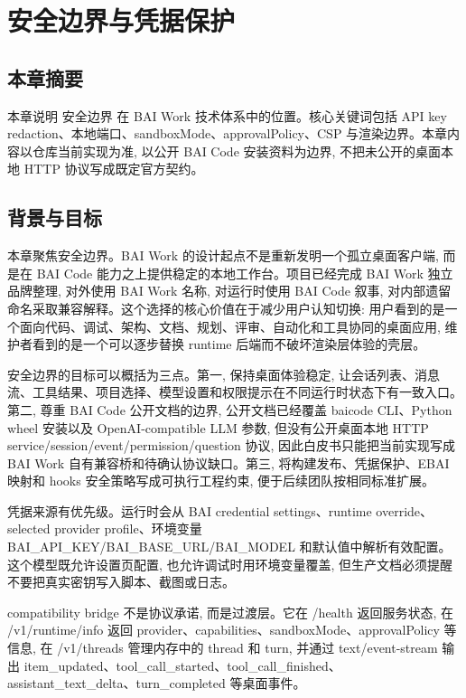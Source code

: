 \chapter{安全边界与凭据保护}
\section{本章摘要}
本章说明 安全边界 在 BAI Work 技术体系中的位置。核心关键词包括 API key redaction、本地端口、sandboxMode、approvalPolicy、CSP 与渲染边界。本章内容以仓库当前实现为准, 以公开 BAI Code 安装资料为边界, 不把未公开的桌面本地 HTTP 协议写成既定官方契约。

\section{背景与目标}
本章聚焦安全边界。BAI Work 的设计起点不是重新发明一个孤立桌面客户端, 而是在 BAI Code 能力之上提供稳定的本地工作台。项目已经完成 BAI Work 独立品牌整理, 对外使用 BAI Work 名称, 对运行时使用 BAI Code 叙事, 对内部遗留命名采取兼容解释。这个选择的核心价值在于减少用户认知切换: 用户看到的是一个面向代码、调试、架构、文档、规划、评审、自动化和工具协同的桌面应用, 维护者看到的是一个可以逐步替换 runtime 后端而不破坏渲染层体验的壳层。

安全边界的目标可以概括为三点。第一, 保持桌面体验稳定, 让会话列表、消息流、工具结果、项目选择、模型设置和权限提示在不同运行时状态下有一致入口。第二, 尊重 BAI Code 公开文档的边界, 公开文档已经覆盖 baicode CLI、Python wheel 安装以及 OpenAI-compatible LLM 参数, 但没有公开桌面本地 HTTP service/session/event/permission/question 协议, 因此白皮书只能把当前实现写成 BAI Work 自有兼容桥和待确认协议缺口。第三, 将构建发布、凭据保护、EBAI 映射和 hooks 安全策略写成可执行工程约束, 便于后续团队按相同标准扩展。

凭据来源有优先级。运行时会从 BAI credential settings、runtime override、selected provider profile、环境变量 BAI\_API\_KEY/BAI\_BASE\_URL/BAI\_MODEL 和默认值中解析有效配置。这个模型既允许设置页配置, 也允许调试时用环境变量覆盖, 但生产文档必须提醒不要把真实密钥写入脚本、截图或日志。

compatibility bridge 不是协议承诺, 而是过渡层。它在 /health 返回服务状态, 在 /v1/runtime/info 返回 provider、capabilities、sandboxMode、approvalPolicy 等信息, 在 /v1/threads 管理内存中的 thread 和 turn, 并通过 text/event-stream 输出 item\_updated、tool\_call\_started、tool\_call\_finished、assistant\_text\_delta、turn\_completed 等桌面事件。

